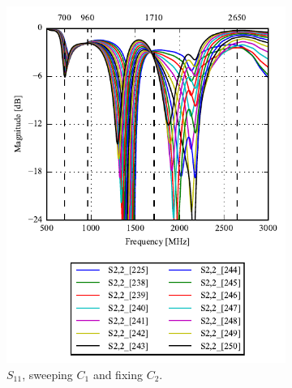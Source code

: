 \begin{figure}[htbp]
\begin{subfigure}[b]{0.49\linewidth}
        \includegraphics{img/tech_sol/monopole/read_mode/s22}
        \caption{$S_{11}$, sweeping $C_1$ and fixing $C_2$.}
        \label{fig:ant1_s22}
    \end{subfigure}
~
    \begin{subfigure}[b]{0.49\linewidth}
        \centering

\end{subfigure}
\end{figure}

